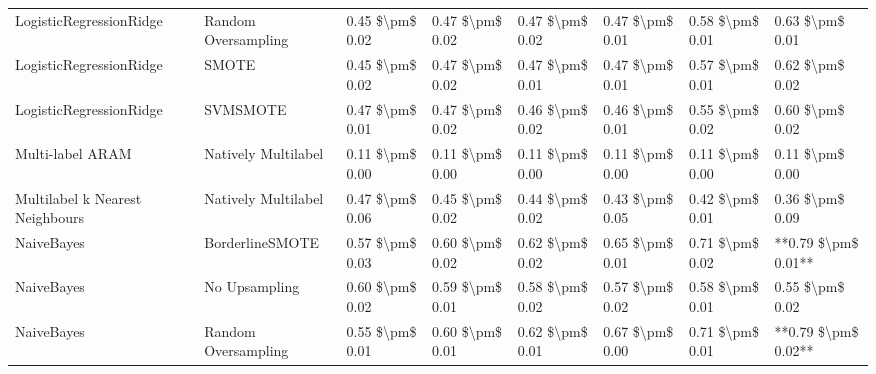 \begin{tabular}{llllllll}
        LogisticRegressionRidge &           Random Oversampling & 0.45 \$\textbackslash pm\$ 0.02 &           0.47 \$\textbackslash pm\$ 0.02 &       0.47 \$\textbackslash pm\$ 0.02 &        0.47 \$\textbackslash pm\$ 0.01 &                         0.58 \$\textbackslash pm\$ 0.01 &     0.63 \$\textbackslash pm\$ 0.01 \\
        LogisticRegressionRidge &                         SMOTE & 0.45 \$\textbackslash pm\$ 0.02 &           0.47 \$\textbackslash pm\$ 0.02 &       0.47 \$\textbackslash pm\$ 0.01 &        0.47 \$\textbackslash pm\$ 0.01 &                         0.57 \$\textbackslash pm\$ 0.01 &     0.62 \$\textbackslash pm\$ 0.02 \\
        LogisticRegressionRidge &                      SVMSMOTE & 0.47 \$\textbackslash pm\$ 0.01 &           0.47 \$\textbackslash pm\$ 0.02 &       0.46 \$\textbackslash pm\$ 0.02 &        0.46 \$\textbackslash pm\$ 0.01 &                         0.55 \$\textbackslash pm\$ 0.02 &     0.60 \$\textbackslash pm\$ 0.02 \\
               Multi-label ARAM &           Natively Multilabel & 0.11 \$\textbackslash pm\$ 0.00 &           0.11 \$\textbackslash pm\$ 0.00 &       0.11 \$\textbackslash pm\$ 0.00 &        0.11 \$\textbackslash pm\$ 0.00 &                         0.11 \$\textbackslash pm\$ 0.00 &     0.11 \$\textbackslash pm\$ 0.00 \\
Multilabel k Nearest Neighbours &           Natively Multilabel & 0.47 \$\textbackslash pm\$ 0.06 &           0.45 \$\textbackslash pm\$ 0.02 &       0.44 \$\textbackslash pm\$ 0.02 &        0.43 \$\textbackslash pm\$ 0.05 &                         0.42 \$\textbackslash pm\$ 0.01 &     0.36 \$\textbackslash pm\$ 0.09 \\
                     NaiveBayes &               BorderlineSMOTE & 0.57 \$\textbackslash pm\$ 0.03 &           0.60 \$\textbackslash pm\$ 0.02 &       0.62 \$\textbackslash pm\$ 0.02 &        0.65 \$\textbackslash pm\$ 0.01 &                         0.71 \$\textbackslash pm\$ 0.02 & **0.79 \$\textbackslash pm\$ 0.01** \\
                     NaiveBayes &                 No Upsampling & 0.60 \$\textbackslash pm\$ 0.02 &           0.59 \$\textbackslash pm\$ 0.01 &       0.58 \$\textbackslash pm\$ 0.02 &        0.57 \$\textbackslash pm\$ 0.02 &                         0.58 \$\textbackslash pm\$ 0.01 &     0.55 \$\textbackslash pm\$ 0.02 \\
                     NaiveBayes &           Random Oversampling & 0.55 \$\textbackslash pm\$ 0.01 &           0.60 \$\textbackslash pm\$ 0.01 &       0.62 \$\textbackslash pm\$ 0.01 &        0.67 \$\textbackslash pm\$ 0.00 &                         0.71 \$\textbackslash pm\$ 0.01 & **0.79 \$\textbackslash pm\$ 0.02** \\

\end{tabular}
